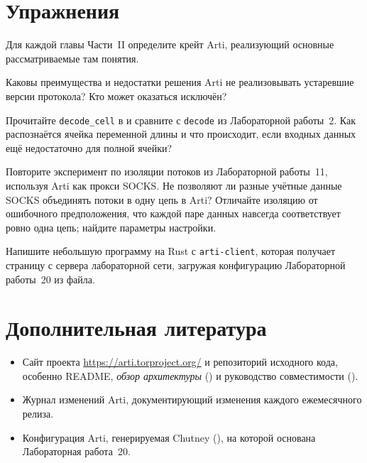 \section*{Упражнения}

\begin{esercizio}[1]\label{es:30-crate}
Для каждой главы Части~II определите крейт Arti, реализующий основные рассматриваемые там понятия.
\end{esercizio}

\begin{esercizio}[1]\label{es:30-obsoleto}
Каковы преимущества и недостатки решения Arti не реализовывать устаревшие версии протокола? Кто может оказаться исключён?
\end{esercizio}

\begin{esercizio}[2]\label{es:30-cella}
Прочитайте \texttt{decode\_cell} в  и сравните с \texttt{decode} из Лабораторной работы~2. Как распознаётся ячейка переменной длины и что происходит, если входных данных ещё недостаточно для полной ячейки?
\end{esercizio}

\begin{esercizio}[2]\label{es:30-isolamento}
Повторите эксперимент по изоляции потоков из Лабораторной работы~11, используя Arti как прокси SOCKS. Не позволяют ли разные учётные данные SOCKS объединять потоки в одну цепь в Arti? Отличайте изоляцию от ошибочного предположения, что каждой паре данных навсегда соответствует ровно одна цепь; найдите параметры настройки.
\end{esercizio}

\begin{esercizio}[3]\label{es:30-libreria}
Напишите небольшую программу на Rust с \texttt{arti-client}, которая получает страницу с сервера лабораторной сети, загружая конфигурацию Лабораторной работы~20 из файла.
\end{esercizio}

\section*{Дополнительная литература}
\begin{itemize}
  \item Сайт проекта \url{https://arti.torproject.org/} и репозиторий исходного кода, особенно README, \emph{обзор архитектуры} () и руководство совместимости ().
  \item Журнал изменений Arti, документирующий изменения каждого ежемесячного релиза.
  \item Конфигурация Arti, генерируемая Chutney (), на которой основана Лабораторная работа~20.
\end{itemize}
